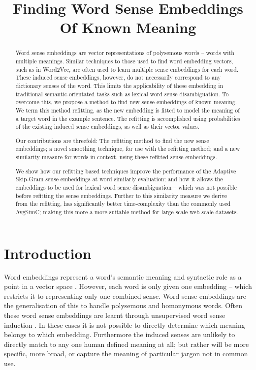 \documentclass{sig-alternate}
\begin{document}
\title{Finding Word Sense Embeddings Of Known Meaning}

\maketitle

\begin{abstract}
Word sense embeddings are vector representations of polysemous words -- words with multiple meanings. Similar techniques to those used to find word embedding vectors, such as in Word2Vec, are often used to learn multiple sense embeddings for each word.
These induced sense embeddings, however, do not necessarily correspond to any dictionary senses of the word.
This limits the applicability of these embedding in traditional semantic-orientated tasks such as lexical word sense disambiguation.
To overcome this, we propose a method to find new sense embeddings of known meaning.
We term this method refitting, as the new embedding is fitted to model the meaning of a target word in the example sentence. The refitting is accomplished using probabilities of the existing induced sense embeddings, as well as their vector values.

Our contributions are threefold:
The refitting method to find the new sense embeddings;
a novel smoothing technique, for use with the refitting method;
and a new similarity measure for words in context, using these refitted sense embeddings.

We show how our refitting based techniques improve the performance of the Adaptive Skip-Gram sense embeddings at word similarly evaluation; and how it allows the embeddings to be used for lexical word sense disambiguation -- which was not possible before refitting the sense embeddings.
Further to this similarity measure we derive from the refitting, has significantly better time-complexity than the commonly used AvgSimC; making this more a more suitable method for large scale web-scale datasets.
\end{abstract}


\section{Introduction}


Word embeddings represent a word's semantic meaning and syntactic role as a point in a vector space \parencite{NPLM, collobert2008unified, mikolov2013efficient}. However, each word is only given one embedding -- which restricts it to representing only one combined sense. Word sense embeddings are the generalisation of this to handle polysemous and homonymous  words. Often these word sense embeddings are learnt through unsupervised word sense induction \parencite{Reisinger2010,Huang2012,tian2014probabilistic, AdaGrams}. In these cases it is not possible to directly determine which meaning belongs to which embedding. Furthermore the induced senses are unlikely to directly match to any one human defined meaning at all; but rather will be more specific, more broad, or capture the meaning of particular jargon not in common use.
\end{document}
